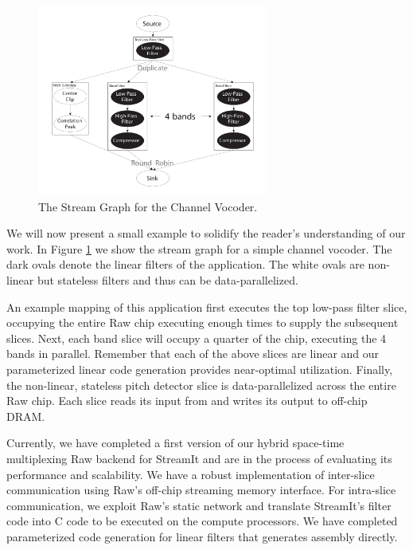 \documentclass{csailabstractbook}
\begin{document}
\begin{figure}[tbh]
	\vspace{-.2in}
  \centerline{\includegraphics[width=3.0in]{mgordon_figure1.pdf}}
	\vspace{-.2in}
  \caption{The Stream Graph for the Channel Vocoder.}
	\vspace{-.2in}
  \label{streamgraph}
\end{figure}


   
We will now present a small example to solidify the reader's
understanding of our work.  In Figure \ref{streamgraph} we show the
stream graph for a simple channel vocoder.  The dark ovals denote
the linear filters of the application.  The white ovals are non-linear
but stateless filters and thus can be data-parallelized.  

An example mapping of this application first executes the top low-pass
filter slice, occupying the entire Raw chip executing enough times to
supply the subsequent slices. Next, each band slice will occupy a
quarter of the chip, executing the 4 bands in parallel.  Remember that
each of the above slices are linear and our parameterized linear code
generation provides near-optimal utilization. Finally, the non-linear,
stateless pitch detector slice is data-parallelized across the entire
Raw chip. Each slice reads its input from and writes its output to
off-chip DRAM.
 
Currently, we have completed a first version of our hybrid space-time
multiplexing Raw backend for StreamIt and are in the process of
evaluating its performance and scalability.  We have a robust
implementation of inter-slice communication using Raw's off-chip
streaming memory interface.  For intra-slice communication, we exploit
Raw's static network and translate StreamIt's filter code into C
code to be executed on the compute processors.  We have completed
parameterized code generation for linear filters that generates
assembly directly.   
\end{document}
